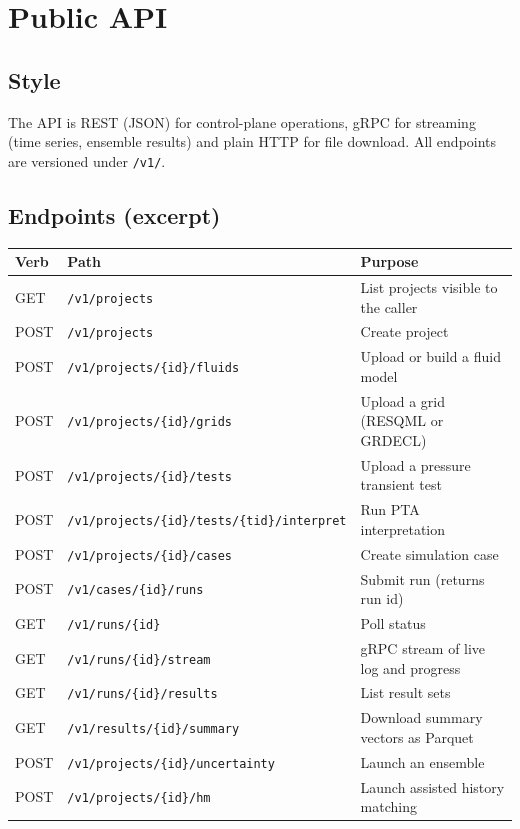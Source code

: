 \documentclass[11pt,a4paper]{article}
\newcommand{\code}[1]{\texttt{#1}}
\begin{document}
\section{Public API}

\subsection{Style}
The API is REST (JSON) for control-plane operations, gRPC for streaming
(time series, ensemble results) and plain HTTP for file download. All endpoints
are versioned under \code{/v1/}.

\subsection{Endpoints (excerpt)}

\begin{longtable}{@{}p{1.4cm}p{4.6cm}p{8.2cm}@{}}
\toprule
\textbf{Verb} & \textbf{Path} & \textbf{Purpose}\\
\midrule
\endhead
GET    & \code{/v1/projects} & List projects visible to the caller\\
POST   & \code{/v1/projects} & Create project\\
POST   & \code{/v1/projects/\{id\}/fluids} & Upload or build a fluid model\\
POST   & \code{/v1/projects/\{id\}/grids} & Upload a grid (RESQML or GRDECL)\\
POST   & \code{/v1/projects/\{id\}/tests} & Upload a pressure transient test\\
POST   & \code{/v1/projects/\{id\}/tests/\{tid\}/interpret} & Run PTA interpretation\\
POST   & \code{/v1/projects/\{id\}/cases} & Create simulation case\\
POST   & \code{/v1/cases/\{id\}/runs} & Submit run (returns run id)\\
GET    & \code{/v1/runs/\{id\}} & Poll status\\
GET    & \code{/v1/runs/\{id\}/stream} & gRPC stream of live log and progress\\
GET    & \code{/v1/runs/\{id\}/results} & List result sets\\
GET    & \code{/v1/results/\{id\}/summary} & Download summary vectors as Parquet\\
POST   & \code{/v1/projects/\{id\}/uncertainty} & Launch an ensemble\\
POST   & \code{/v1/projects/\{id\}/hm} & Launch assisted history matching\\
\bottomrule
\end{longtable}
\end{document}

